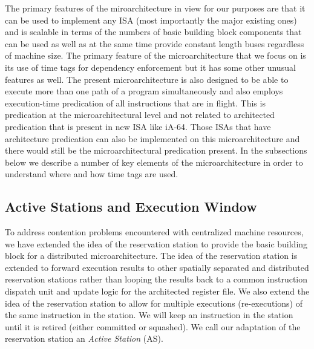 \documentclass[10pt,dvips]{article}
\begin{document}
The primary features of the miroarchitecture in view for
our purposes are that it can 
be used to implement
any ISA (most importantly the major existing ones) and
is scalable in terms of the numbers of basic building block
components that can be used as well as at the same time provide
constant length buses regardless of machine size.
The primary feature of the microarchitecture that we focus on
is its use of time tags for dependency enforcement but it
has some other unusual features as well.  
The present microarchitecture
is also designed to be able to execute more than one path
of a program simultaneously and also employs execution-time
predication of all instructions that are in flight.
This is predication at the microarchitectural level and not
related to architected predication that is present in
new ISA like iA-64.  Those ISAs that have architecture predication
can also be implemented on this microarchitecture and there would
still be the microarchitectural predication present.
In the subsections below we describe a number of key elements
of the microarchitecture in order to understand where and how
time tags are used.
%
%
\subsection{Active Stations and Execution Window}
%
To address contention problems encountered with centralized
machine resources, we have extended the idea of the reservation
station \cite{Tom67} to provide the basic building block for a distributed
microarchitecture.  
The idea of the reservation station is extended to 
forward execution results to other spatially
separated and distributed reservation stations
rather than looping the results back to a common instruction dispatch
unit
and update logic for the architected register file.  
We also extend the idea
of the reservation station to allow for multiple executions (re-executions)
of the same instruction in the station.  We will keep an 
instruction in the station until it is retired (either committed or 
squashed).  
We call our adaptation of the reservation station an 
{\em Active Station} (AS).  
\end{document}

